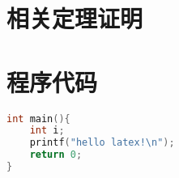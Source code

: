 \begin{appendices}
\section{相关定理证明}

\section{程序代码}


\begin{lstlisting}[language=C++]
int main(){
    int i;
    printf("hello latex!\n");
    return 0;
}
\end{lstlisting}







%
\end{appendices}%

